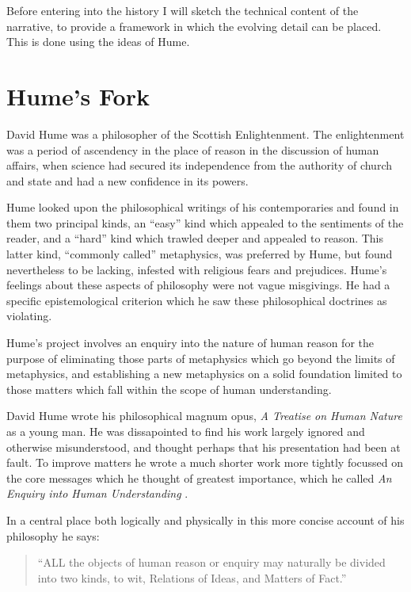 Before entering into the history I will sketch the technical content
of the narrative, to provide a framework in which the evolving detail
can be placed.
This is done using the ideas of Hume.

\section{Hume's Fork}\label{HumesFork}

David Hume was a philosopher of the Scottish Enlightenment.
The enlightenment was a period of ascendency in the place of reason in
the discussion of human affairs, when science had secured its
independence from the authority of church and state and had a new
confidence in its powers.

Hume looked upon the philosophical writings of his contemporaries and
found in them two principal kinds, an ``easy'' kind which appealed to
the sentiments of the reader, and a ``hard'' kind which trawled deeper
and appealed to reason.
This latter kind, ``commonly called'' metaphysics, was preferred by
Hume, but found nevertheless to be lacking, infested with religious 
fears and prejudices.
Hume's feelings about these aspects of philosophy were not vague
misgivings.
He had a specific epistemological criterion which he saw these
philosophical doctrines as violating.

Hume's project involves an enquiry into the nature of human reason for
the purpose of eliminating those parts of metaphysics which go beyond
the limits of metaphysics, and establishing a new metaphysics on a
solid foundation limited to those matters which fall within the scope
of human understanding.

David Hume wrote his philosophical magnum opus, \emph{A Treatise on
  Human Nature} \cite{humeTHN} as a young man.
He was dissapointed to find his work largely ignored and otherwise
misunderstood, and thought perhaps that his presentation had been at
fault.
To improve matters he wrote a much shorter work more tightly focussed
on the core messages which he thought of greatest importance, which he
called \emph{An Enquiry into Human Understanding} \cite{humeECHU}.

In a central place both logically and physically in this more concise
account of his philosophy he says:

\begin{quote}
``ALL the objects of human reason or enquiry may naturally be divided
  into two kinds, to wit, Relations of Ideas, and Matters of Fact.'' 
\end{quote}


